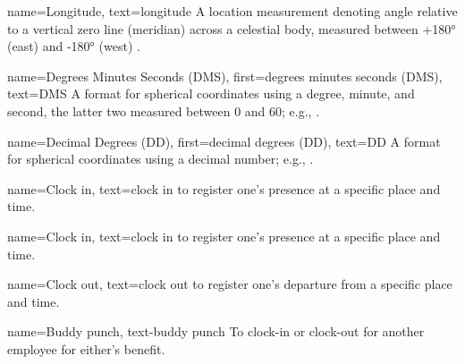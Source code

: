 {
  name={Longitude},
  text={longitude}
}
{
  A location measurement denoting angle relative to a
  vertical zero line (meridian) across a celestial body,
  measured between +\ang{180} (east) and -\ang{180} (west)
  \parencite{coordSystems}.
}

{
  name={Degrees Minutes Seconds (DMS)},
  first={degrees minutes seconds (DMS)},
  text={DMS}
}
{
  A format for spherical coordinates using a degree,
  minute,
  and second, the latter two measured between 0 and 60;
  e.g.,  \parencite{coordSystems}.
}

{
  name={Decimal Degrees (DD)},
  first={decimal degrees (DD)},
  text={DD}
}
{
  A format for spherical coordinates using a decimal
  number;
  e.g.,  \parencite{coordSystems}.
}

{
  name={Clock in},
  text={clock in}
}
{
  to register one's presence at a specific place and time.
}

{
  name={Clock in},
  text={clock in}
}
{
  to register one's presence at a specific place and time.
}

{
  name={Clock out},
  text={clock out}
}
{
  to register one's departure from a specific place and
  time.
}

{
  name={Buddy punch},
  text-{buddy punch}
}
{
  To clock-in or clock-out for another employee for either's
  benefit. 
}